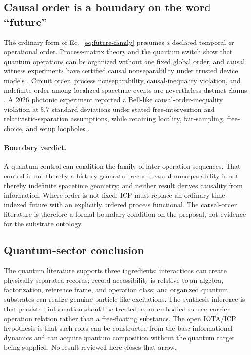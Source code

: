\subsection{Causal order is a boundary on the word ``future''}

The ordinary form of Eq.~\eqref{eq:future-family} presumes a declared temporal
or operational order.  Process-matrix theory and the quantum switch show that
quantum operations can be organized without one fixed global order, and causal
witness experiments have certified causal nonseparability under trusted device
models \citep{OreshkovEtAl2012CausalOrder}.  Circuit order, process
nonseparability, causal-inequality violation, and indefinite order among
localized spacetime events are nevertheless distinct claims
\citep{PaunkovicVojinovic2020CausalOrders,OrmrodEtAl2023SectorialConstraints}.
A 2026 photonic experiment reported a Bell-like causal-order-inequality
violation at 5.7 standard deviations under stated free-intervention and
relativistic-separation assumptions, while retaining locality, fair-sampling,
free-choice, and setup loopholes \citep{GuoEtAl2026CausalOrder}.

\paragraph{Boundary verdict.}
A quantum control can condition the family of later operation sequences.  That
control is not thereby a history-generated record; causal nonseparability is
not thereby indefinite spacetime geometry; and neither result derives
causality from information.  Where order is not fixed, ICP must replace an
ordinary time-indexed future with an explicitly ordered process functional.
The causal-order literature is therefore a formal boundary condition on the
proposal, not evidence for the substrate ontology.

\subsection{Quantum-sector conclusion}

The quantum literature supports three ingredients: interactions can create
physically separated records; record accessibility is relative to an algebra,
factorization, reference frame, and operation class; and organized quantum
substrates can realize genuine particle-like excitations.  The synthesis
inference is that persisted information should be treated as an embodied
source--carrier--operation relation rather than a free-floating substance.
The open IOTA/ICP hypothesis is that such roles can be constructed from the base
informational dynamics and can acquire quantum composition without the quantum
target being supplied.  No result reviewed here closes that arrow.
